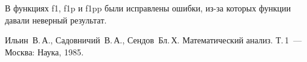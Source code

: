 \documentclass[a4paper,12pt,titlepage,finall]{article}
\begin{document}
В функциях f1, f1p и f1pp были исправлены ошибки, из-за которых функции давали неверный результат.\par


\newpage
\begin{raggedright}
\begin{thebibliography}{99}
 Ильин~В.\,А., Садовничий~В.\,А., Сендов~Бл.\,Х. Математический анализ. Т.\,1~---
    Москва: Наука, 1985.
\end{thebibliography}
\end{raggedright}
\end{document}
